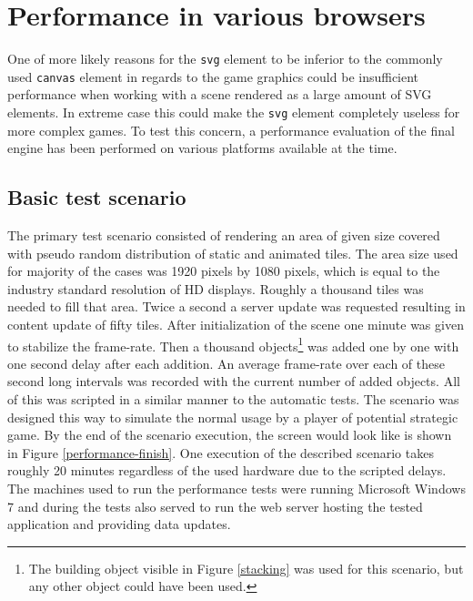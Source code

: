 \documentclass[11pt,oneside, final]{fithesis2}
\begin{document}
\section{Performance in various browsers}
One of more likely reasons for the \texttt{svg} element to be inferior to the commonly used \texttt{canvas} element in regards to the game graphics could be insufficient performance when working with a scene rendered as a large amount of SVG elements. In extreme case this could make the \texttt{svg} element completely useless for more complex games. To test this concern, a performance evaluation of the final engine has been performed on various platforms available at the time.

\subsection{Basic test scenario}
The primary test scenario consisted of rendering an area of given size covered with pseudo random distribution of static and animated tiles. The area size used for majority of the cases was 1920 pixels by 1080 pixels, which is equal to the industry standard resolution of HD displays. Roughly a thousand tiles was needed to fill that area. Twice a second a server update was requested resulting in content update of fifty tiles. After initialization of the scene one minute was given to stabilize the frame-rate. Then a thousand objects\footnote{The building object visible in Figure \ref{stacking} was used for this scenario, but any other object could have been used.} was added one by one with one second delay after each addition. An average frame-rate over each of these second long intervals was recorded with the current number of added objects. All of this was scripted in a similar manner to the automatic tests. The scenario was designed this way to simulate the normal usage by a player of potential strategic game. By the end of the scenario execution, the screen would look like is shown in Figure \ref{performance-finish}. One execution of the described scenario takes roughly 20 minutes regardless of the used hardware due to the scripted delays. The machines used to run the performance tests were running Microsoft Windows 7 and during the tests also served to run the web server hosting the tested application and providing data updates.
\end{document}
